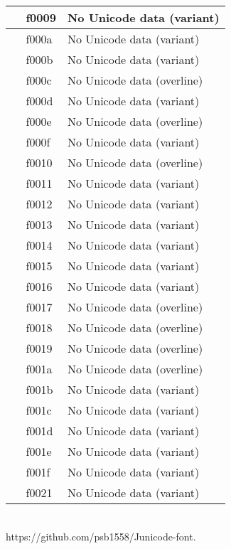 \documentclass[12pt,letterpaper,openany]{book}
\begin{document}
\begin{center}
\begin{supertabular}{|m{0.25in}|m{0.5in}|m{4in}|}
󰀉 & f0009 & No Unicode data (variant)\\\hline
󰀊 & f000a & No Unicode data (variant)\\\hline
󰀋 & f000b & No Unicode data (variant)\\\hline
󰀌 & f000c & No Unicode data (overline)\\\hline
󰀍 & f000d & No Unicode data (variant)\\\hline
󰀎 & f000e & No Unicode data (overline)\\\hline
󰀏 & f000f & No Unicode data (variant)\\\hline
󰀐 & f0010 & No Unicode data (overline)\\\hline
󰀑 & f0011 & No Unicode data (variant)\\\hline
󰀒 & f0012 & No Unicode data (variant)\\\hline
󰀓 & f0013 & No Unicode data (variant)\\\hline
󰀔 & f0014 & No Unicode data (variant)\\\hline
󰀕 & f0015 & No Unicode data (variant)\\\hline
󰀖 & f0016 & No Unicode data (variant)\\\hline
󰀗 & f0017 & No Unicode data (overline)\\\hline
󰀘 & f0018 & No Unicode data (overline)\\\hline
󰀙 & f0019 & No Unicode data (overline)\\\hline
󰀚 & f001a & No Unicode data (overline)\\\hline
󰀛 & f001b & No Unicode data (variant)\\\hline
󰀜 & f001c & No Unicode data (variant)\\\hline
󰀝 & f001d & No Unicode data (variant)\\\hline
󰀞 & f001e & No Unicode data (variant)\\\hline
󰀟 & f001f & No Unicode data (variant)\\\hline
󰀡 & f0021 & No Unicode data (variant)\\\hline
\end{supertabular}
\end{center}

\vspace*{\fill}
\begin{center}
{}\\
{\color{myRed}https://github.com/psb1558/Junicode-font.}
\end{center}
\end{document}
